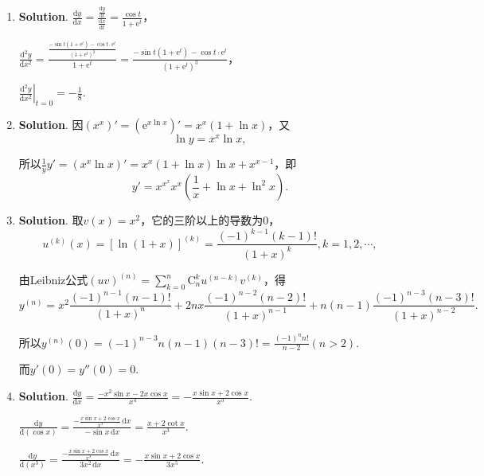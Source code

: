 \documentclass[../Main.tex]{subfiles}
\begin{document}
\begin{enumerate}
          $x=k\pi(k=\pm1,\pm2,\cdots)$是无穷间断点.因为
          \[
              \lim_{x\to k\pi^+}\mathrm{e}^{\frac{|x|}{\tan x}}=\mathrm{e}^{+\infty}=+\infty
              .
          \]

          $x=k\pi+\frac{\pi}{2}(k=0,\pm1,\pm2,\cdots)$是可去间断点.因为
          \[
              \lim_{x\to k\pi+\frac{\pi}{2}}\mathrm{e}^{\frac{|x|}{\tan x}}=\mathrm{e}^{0}
              =1.
          \]

    \item \textbf{Solution}. $\frac{\mathrm{d}y}{\mathrm{d}x}=\frac{\frac{\mathrm{d}y}{\mathrm{d}t}}{\frac{\mathrm{d}x}{\mathrm{d}t}}
              =\frac{\cos t}{1+\mathrm{e}^{t}}$，

          $\frac{\mathrm{d}^{2} y}{\mathrm{d}x^{2}}=\frac{\frac{-\sin t\left(1+\mathrm{e}^{t}\right)-\cos
                      t\cdot\mathrm{e}^{t}}{\left(1+\mathrm{e}^{t}\right)^{2}}}{1+\mathrm{e}^{t}}
              =\frac{-\sin t\left(1+\mathrm{e}^{t}\right)-\cos t\cdot\mathrm{e}^{t}}{\left(1+\mathrm{e}^{t}\right)^{3}}$，

          $\left.\frac{\mathrm{d}^{2} y}{\mathrm{d}x^{2}}\right|_{t=0}=-\frac{1}{8}$.

    \item \textbf{Solution}. 因$\left(x^{x}\right)'=\left(\mathrm{e}^{x\ln x}\right
              )'=x^{x}(1+\ln x)$，又
          \[
              \ln y=x^{x}\ln x,
          \]

          所以$\frac{1}{y}y'=\left(x^{x}\ln x\right)'=x^{x}(1+\ln x)\ln x+x^{x-1}$，即
          \[
              y'=x^{x^x}x^{x}\left(\frac{1}{x}+\ln x+\ln^{2} x\right).
          \]

    \item \textbf{Solution}. 取$v(x)=x^{2}$，它的三阶以上的导数为0，
          \[
              u^{(k)}(x)=\left[\ln(1+x)\right]^{(k)}=\frac{(-1)^{k-1}(k-1)!}{(1+x)^{k}}
              ,k=1,2,\cdots,
          \]

          由Leibniz公式$(uv)^{(n)}=\sum_{k=0}^{n}\mathrm{C}_{n}^{k}u^{(n-k)}v^{(k)}$，得
          \[
              y^{(n)}=x^{2}\frac{(-1)^{n-1}(n-1)!}{(1+x)^{n}}+2nx\frac{(-1)^{n-2}(n-2)!}{(1+x)^{n-1}}
              +n(n-1)\frac{(-1)^{n-3}(n-3)!}{(1+x)^{n-2}}.
          \]

          所以$y^{(n)}(0)=(-1)^{n-3}n(n-1)(n-3)!=\frac{(-1)^{n}n!}{n-2}(n>2)$.

          而$y'(0)=y''(0)=0$.

    \item \textbf{Solution}. $\frac{\mathrm{d}y}{\mathrm{d}x}=\frac{-x^{2}\sin x-2x\cos
                  x}{x^{4}}=-\frac{x\sin x+2\cos x}{x^{3}}$.

          $\frac{\mathrm{d}y}{\mathrm{d}(\cos x)}=\frac{-\frac{x\sin x+2\cos x}{x^{3}}\,\mathrm{d}x}{-\sin
                  x\,\mathrm{d}x}=\frac{x+2\cot x}{x^{3}}$.

          $\frac{\mathrm{d}y}{\mathrm{d}(x^{3})}=\frac{-\frac{x\sin x+2\cos x}{x^{3}}\,\mathrm{d}x}{3x^{2}\,\mathrm{d}x}
              =-\frac{x\sin x+2\cos x}{3x^{5}}$.
\end{enumerate}
\end{document}
